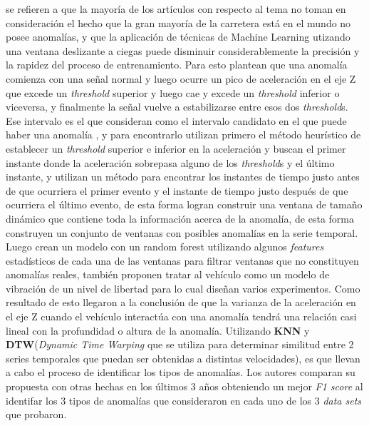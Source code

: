 \cite{zheng2020fused} se refieren a que la mayoría de los artículos con respecto al tema no toman en consideración el hecho que la gran mayoría de la
carretera está en el mundo no posee anomalías, y que la aplicación de técnicas de Machine Learning utizando una ventana deslizante a ciegas puede
disminuir considerablemente la precisión y la rapidez del proceso de entrenamiento. Para esto plantean que una anomalía comienza con una señal normal
y luego ocurre un pico de aceleración en el eje Z que excede un \emph{threshold} superior y luego cae y excede un \emph{threshold} inferior o viceversa,
y finalmente la señal vuelve a estabilizarse entre esos dos \emph{threshold}s. Ese intervalo es el que consideran como el intervalo candidato en el que
puede haber una anomalía , y para encontrarlo utilizan primero el método heurístico de establecer un \emph{threshold} superior e inferior en la aceleración
y buscan el primer instante donde la aceleración sobrepasa alguno de los \emph{threshold}s y el último instante, y utilizan un método para encontrar los
instantes de tiempo justo antes de que ocurriera el primer evento y el instante de tiempo justo después de que ocurriera el último evento, de esta forma
logran construir una ventana de tamaño dinámico que contiene toda la información acerca de la anomalía, de esta forma construyen un conjunto de ventanas
con posibles anomalías en la serie temporal. Luego crean un modelo con un random forest utilizando algunos \emph{features} estadísticos de cada una de las ventanas
para filtrar ventanas que no constituyen anomalías reales, también proponen tratar al vehículo como un modelo de vibración de un nivel de libertad para lo
cual diseñan varios experimentos. Como resultado de esto llegaron a la conclusión de que la varianza de la aceleración en el eje Z cuando el vehículo interactúa
con una anomalía tendrá una relación casi lineal con la profundidad o altura de la anomalía. Utilizando \textbf{KNN} y \textbf{DTW}(\emph{Dynamic Time Warping}
que se utiliza para determinar similitud entre 2 series temporales que puedan ser obtenidas a distintas velocidades), es que llevan a cabo el proceso
de identificar los tipos de anomalías. Los autores comparan su propuesta con otras hechas en los últimos 3 años obteniendo un mejor \emph{F1 score} al
identifar los 3 tipos de anomalías que consideraron en cada uno de los 3 \emph{data sets} que probaron.
